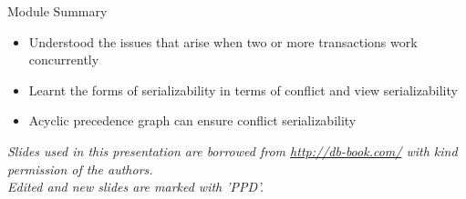 \documentclass[aspectratio=169, xcolor=dvipsnames]{beamer}
\begin{document}
\begin{frame}{Module Summary}
    \begin{block}{}
        \begin{itemize}[<+->]
            \item Understood the issues that arise when two or more transactions work concurrently
            \item Learnt the forms of serializability in terms of conflict and view serializability
            \item Acyclic precedence graph can ensure conflict serializability
        \end{itemize}
    \end{block}
    \vspace{2em}
    \begin{center}
    \small \textit{Slides used in this presentation are borrowed from \url{http://db-book.com/} with kind permission of the authors.} \\
    \small \textit{Edited and new slides are marked with 'PPD'.}
    \end{center}
\end{frame}
\end{document}
